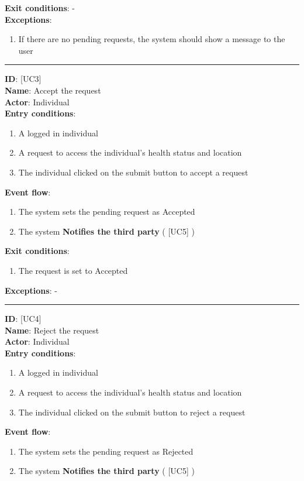 \documentclass[hidelinks, 12pt]{report}
\newcommand\usecase[1]{ [UC#1] }
\begin{document}
\begin{itemize}
		\textbf{Exit conditions}: - \\
		\textbf{Exceptions}:
		\begin{enumerate}
			\item{If there are no pending requests, the system should show a message to the user}
		\end{enumerate}
		\rule{\linewidth}{0.4pt}
		\textbf{ID}: \usecase{3} \\
		\textbf{Name}: Accept the request \\
		\textbf{Actor}: Individual \\
		\textbf{Entry conditions}:
		\begin{enumerate}
			\item{A logged in individual}
			\item{A request to access the individual's health status and location}
			\item{The individual clicked on the submit button to accept a request}
		\end{enumerate}
		\textbf{Event flow}:
		\begin{enumerate}
			\item{The system sets the pending request as Accepted}
			\item{The system \textbf{Notifies the third party} (\usecase{5})}
		\end{enumerate}
		\textbf{Exit conditions}:
		\begin{enumerate}
			\item{The request is set to Accepted}
		\end{enumerate}
		\textbf{Exceptions}: - \\
		\rule{\linewidth}{0.4pt}
		\textbf{ID}: \usecase{4} \\
		\textbf{Name}: Reject the request \\
		\textbf{Actor}: Individual \\
		\textbf{Entry conditions}:
		\begin{enumerate}
			\item{A logged in individual}
			\item{A request to access the individual's health status and location}
			\item{The individual clicked on the submit button to reject a request}
		\end{enumerate}
		\textbf{Event flow}:
		\begin{enumerate}
			\item{The system sets the pending request as Rejected}
			\item{The system \textbf{Notifies the third party} (\usecase{5})}

\end{enumerate}
\end{itemize}
\end{document}
